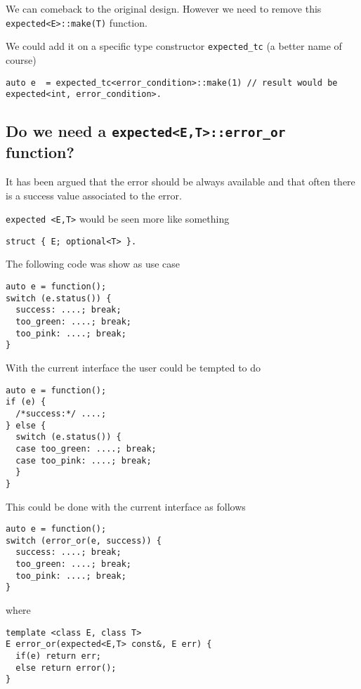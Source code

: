 \documentclass[a4paper,10pt]{article}
\newcommand{\cpp}[1]{\lstinline{#1}}
\begin{document}
\noindent
We can comeback to the original design. However we need to remove this \cpp{expected<E>::make(T)} function. 

We could add it on a specific type constructor \cpp{expected_tc} (a better name of course)

\begin{lstlisting}
auto e  = expected_tc<error_condition>::make(1) // result would be expected<int, error_condition>.
\end{lstlisting}

\subsection{Do we need a  \cpp{expected<E,T>::error_or} function?}

It has been argued that the error should be always available and that often there is a success value associated to the error.

\cpp{expected <E,T>} would be seen more like something  

\begin{lstlisting}
struct { E; optional<T> }. 
\end{lstlisting}

\noindent
The following code was show as use case

\begin{lstlisting}
auto e = function();
switch (e.status()) {
  success: ....; break;
  too_green: ....; break;
  too_pink: ....; break;
} 
\end{lstlisting}

\noindent
With the current interface the user could be tempted to do

\begin{lstlisting}
auto e = function();
if (e) {
  /*success:*/ ....;
} else {
  switch (e.status()) {
  case too_green: ....; break;
  case too_pink: ....; break;
  }
} 
\end{lstlisting}

\noindent
This could be done with the current interface as follows

\begin{lstlisting}
auto e = function();
switch (error_or(e, success)) {
  success: ....; break;
  too_green: ....; break;
  too_pink: ....; break;
} 
\end{lstlisting}

\noindent
where

\begin{lstlisting}
template <class E, class T>
E error_or(expected<E,T> const&, E err) {
  if(e) return err;
  else return error();
}
\end{lstlisting}
\end{document}
